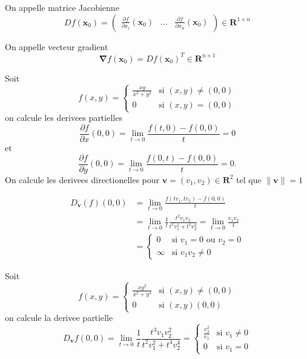 \begin{definition}
On appelle matrice Jacobienne 
$$
Df(\boldsymbol{x}_{0})=\begin{pmatrix}
\frac{ \partial f }{ \partial x_{i} }(\boldsymbol{x}_{0}) & \dots & \frac{ \partial f }{ \partial x_{n} } (\boldsymbol{x}_{0}) 
\end{pmatrix}\in \mathbf{R}^{1\times n}
$$
\end{definition}
\begin{definition}
On appelle vecteur gradient
$$
\boldsymbol{\nabla} f(\boldsymbol{x}_{0})=Df(\boldsymbol{x}_{0})^{T}\in \mathbf{R}^{n\times1}
$$
\end{definition}
\begin{example}
Soit 
$$
f(x,y)=\begin{cases}
\frac{xy}{x^{2}+y^{2}} & \text{si }(x,y)\neq(0,0) \\
0 & \text{si }(x,y)=(0,0)
\end{cases}
$$
on calcule les derivees partielles
$$
\frac{ \partial f }{ \partial x } (0,0)=\lim_{ t \to 0 }  \frac{f(t,0)-f(0,0)}{t}=0
$$
et
$$
\frac{ \partial f }{ \partial y } (0,0)=\lim_{ t \to 0 } \frac{f(0,t)-f(0,0)}{t}=0.
$$
On calcule les derivees directionelles pour $\boldsymbol{v}=(v_{1},v_{2})\in \mathbf{R}^{2}$ tel que $\lVert \boldsymbol{v} \rVert=1$

\begin{align*}
D_{\boldsymbol{v}}(f)(0,0) & =\lim_{ t \to 0 } \frac{f(tv_{1},tv_{2})-f(0,0)}{t} \\
 & =\lim_{ t \to 0 }  \frac{1}{t} \frac{t^{2}v_{1}v_{2}}{t^{2}v_{1}^{2}+t^{2}v_{2}^{2}}= \lim_{ t \to 0 } \frac{v_{1}v_{2}}{t} \\
 & =\begin{cases}
0 & \text{si }v_{1}=0\text{ ou }v_{2}=0  \\
\infty & \text{si } v_{1}v_{2}\neq 0
\end{cases}
\end{align*}

\end{example}
\begin{example}
Soit
$$
f(x,y)=\begin{cases}
\frac{xy^{2}}{x^{2}+y^{4}} & \text{si }(x,y)\neq(0,0) \\
0 & \text{si }(x,y)(0,0)
\end{cases}
$$
on calcule la derivee partielle
$$
D_{\boldsymbol{v}}f(0,0)=\lim_{ t \to 0 } \frac{1}{t} \frac{t^{3}v_{1}v_{2}^{2}}{t^{2}v_{1}^{2}+t^{4}v_{2}^{4}}=\begin{cases}
\frac{v^{2}_{2}}{v_{1}} & \text{si }v_{1}\neq0 \\
0 &  \text{si }v_{1}=0
\end{cases}
$$
\end{example}

